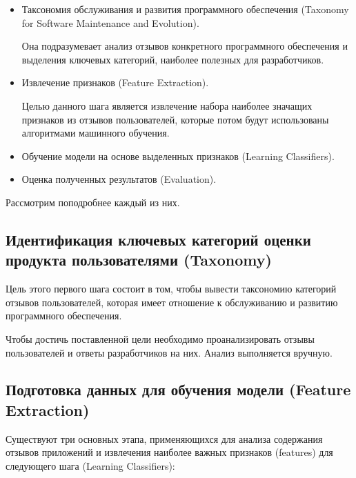 \documentclass[a4paper,12pt]{article}
\begin{document}
	\begin{itemize}
		\item Таксономия обслуживания и развития программного обеспечения (Taxonomy for Software Maintenance and Evolution).
		
		Она подразумевает анализ отзывов конкретного программного обеспечения и выделения ключевых категорий, наиболее полезных для разработчиков.
		
		\item Извлечение признаков (Feature Extraction).
		
		Целью данного шага является извлечение набора наиболее значащих признаков из отзывов пользователей, которые потом будут использованы алгоритмами машинного обучения.
		
		\item Обучение модели на основе выделенных признаков (Learning Classifiers).
		
		\item Оценка полученных результатов (Evaluation).
	\end{itemize}

	Рассмотрим поподробнее каждый из них.
	
	\subsection{Идентификация ключевых категорий оценки продукта пользователями (Taxonomy)}
	
	Цель этого первого шага состоит в том, чтобы вывести таксономию категорий отзывов пользователей, которая имеет отношение к обслуживанию и развитию программного обеспечения.
	
	Чтобы достичь поставленной цели необходимо проанализировать отзывы пользователей и ответы разработчиков на них. Анализ выполняется вручную.
	
	\subsection{Подготовка данных для обучения модели (Feature Extraction)}
	
	Существуют три основных этапа, применяющихся для анализа содержания отзывов приложений и извлечения наиболее важных признаков (features) для следующего шага (Learning Classifiers):
	
\end{document}

